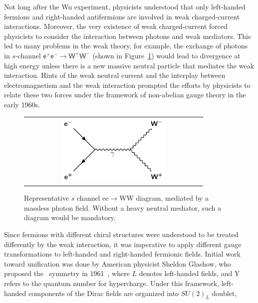 Not long after the Wu experiment, physicists understood that only left-handed fermions and right-handed antifermions are involved in weak charged-current interactions. Moreover, the very existence of weak charged-current forced physicists to consider the interaction between photons and weak mediators. This led to many problems in the weak theory, for example, the exchange of photons in $s$-channel $\textsf{e}^{+}\textsf{e}^{-}\rightarrow\textsf{W}^{+}\textsf{W}^{-}$ (shown in Figure~\ref{fig:eeWW}) would lead to divergence at high energy unless there is a new massive neutral particle that mediates the weak interaction. Hints of the weak neutral current and the interplay between electromagnetism and the weak interaction prompted the efforts by physicists to relate these two forces under the framework of non-abelian gauge theory in the early 1960s. 

\begin{figure}[tbh!]
 \begin{center}
 \begin{tabular}{c}
 \includegraphics[width=0.6\textwidth]{figures/Part1/SM/eeWW}
 \end{tabular}
 \caption{Representative $s$ channel ee$\rightarrow$WW diagram, mediated by a massless photon field. Without a heavy neutral mediator, such a diagram would be mandatory.}
 \label{fig:eeWW}
 \end{center}
\end{figure}

Since fermions with different chiral structures were understood to be treated differently by the weak interaction, it was 
imperative to apply different gauge transformations to left-handed and right-handed fermionic fields. Initial work toward unification was done by American physicist Sheldon Glashow, who proposed the \ew~symmetry in 1961~\cite{Glashow:1961tr}, where $L$ denotes left-handed fields, and Y refers to the quantum number for hypercharge. Under this framework, left-handed components of the Dirac fields are organized into $SU(2)_{L}$ doublet,

